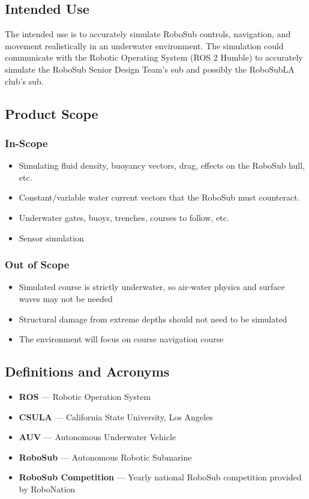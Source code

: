 \documentclass[12pt]{article}
\begin{document}
\subsection{Intended Use} 
The intended use is to accurately simulate RoboSub controls, navigation, and movement realistically in an underwater environment. The simulation could communicate with the Robotic Operating System (ROS 2 Humble) to accurately simulate the RoboSub Senior Design Team's sub and possibly the RoboSubLA club's sub. 

\subsection{Product Scope} 
\subsubsection{In-Scope}
\begin{itemize} 
	\item Simulating fluid density, buoyancy vectors, drag, effects on the RoboSub hull, etc.
	\item Constant/variable water current vectors that the RoboSub must counteract. 
	\item Underwater gates, buoys, trenches, courses to follow, etc. 
	\item Sensor simulation 
\end{itemize} 
\subsubsection{Out of Scope} 
\begin{itemize} 
	\item Simulated course is strictly underwater, so air-water physics and surface waves may not be needed
	\item Structural damage from extreme depths should not need to be simulated 
	\item The environment will focus on course navigation course 
\end{itemize} 

\subsection{Definitions and Acronyms} 
\begin{itemize} 
	\item \textbf{ROS} — Robotic Operation System 
	\item \textbf{CSULA} — California State University, Los Angeles 
	\item \textbf{AUV} — Autonomous Underwater Vehicle 
	\item \textbf{RoboSub} — Autonomous Robotic Submarine
	\item \textbf{RoboSub Competition} — Yearly national RoboSub competition provided by RoboNation
\end{itemize} 
\end{document}
